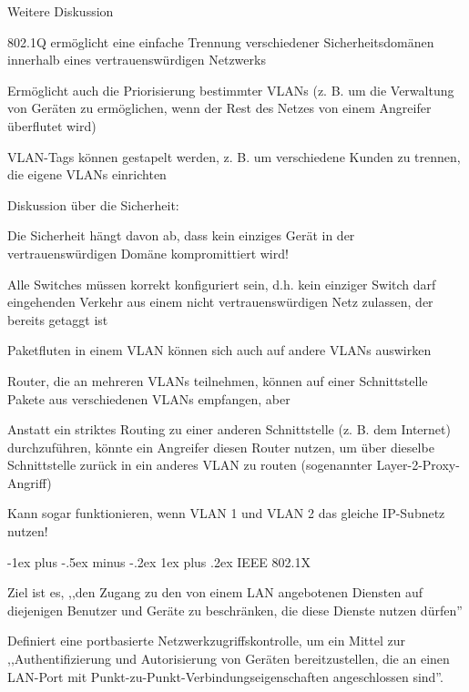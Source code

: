 \documentclass[a4paper]{article}
\makeatletter
\renewcommand{\subsubsection}{\@startsection{subsubsection}{3}{0mm}%
 {-1ex plus -.5ex minus -.2ex}%
 {1ex plus .2ex}%
 {\normalfont\small\bfseries}}
\makeatother
\begin{document}
\begin{multicols}{3}
      Weitere Diskussion
      \begin{itemize*}
            \item 802.1Q ermöglicht eine einfache Trennung verschiedener Sicherheitsdomänen innerhalb eines vertrauenswürdigen Netzwerks
            \begin{itemize*}
                  \item Ermöglicht auch die Priorisierung bestimmter VLANs (z. B. um die Verwaltung von Geräten zu ermöglichen, wenn der Rest des Netzes von einem Angreifer überflutet wird)
                  \item VLAN-Tags können gestapelt werden, z. B. um verschiedene Kunden zu trennen, die eigene VLANs einrichten
            \end{itemize*}
            \item Diskussion über die Sicherheit:
            \begin{itemize*}
                  \item Die Sicherheit hängt davon ab, dass kein einziges Gerät in der vertrauenswürdigen Domäne kompromittiert wird!
                  \item Alle Switches müssen korrekt konfiguriert sein, d.h. kein einziger Switch darf eingehenden Verkehr aus einem nicht vertrauenswürdigen Netz zulassen, der bereits getaggt ist
                  \item Paketfluten in einem VLAN können sich auch auf andere VLANs auswirken
                  \item Router, die an mehreren VLANs teilnehmen, können auf einer Schnittstelle Pakete aus verschiedenen VLANs empfangen, aber
                  \item Anstatt ein striktes Routing zu einer anderen Schnittstelle (z. B. dem Internet) durchzuführen, könnte ein Angreifer diesen Router nutzen, um über dieselbe Schnittstelle zurück in ein anderes VLAN zu routen (sogenannter Layer-2-Proxy-Angriff)
                  \item Kann sogar funktionieren, wenn VLAN 1 und VLAN 2 das gleiche IP-Subnetz nutzen!
            \end{itemize*}
      \end{itemize*}

      \subsubsection{IEEE 802.1X}
      \begin{itemize*}
            \item Ziel ist es, ,,den Zugang zu den von einem LAN angebotenen Diensten auf diejenigen Benutzer und Geräte zu beschränken, die diese Dienste nutzen dürfen''
            \item Definiert eine portbasierte Netzwerkzugriffskontrolle, um ein Mittel zur ,,Authentifizierung und Autorisierung von Geräten bereitzustellen, die an einen LAN-Port mit Punkt-zu-Punkt-Verbindungseigenschaften angeschlossen sind''.
      \end{itemize*}


\end{multicols}
\end{document}
